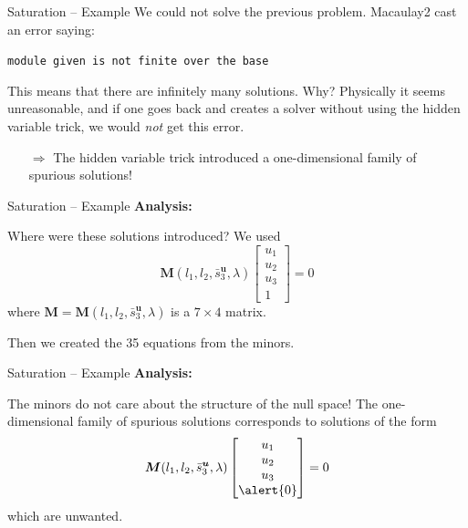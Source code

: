 \documentclass[aspectratio=169]{beamer}
\newcommand{\mat}[1]{\bm{#1}}
\begin{document}
\begin{frame}{Saturation -- Example}
We could not solve the previous problem. Macaulay2 cast an error
saying:
\begin{center}
    \texttt{module given is not finite over the base}
\end{center}

This means that there are infinitely many solutions. Why? Physically it seems unreasonable,
and if one goes back and creates a solver without using the hidden variable trick, we would
\emph{not} get this error.

\begin{itemize}
    \item[$\Rightarrow$] The hidden variable trick introduced a one-dimensional family of
                         spurious solutions!
\end{itemize}
\end{frame}

\begin{frame}{Saturation -- Example}
\textbf{Analysis:}

Where were these solutions introduced?
We used
\begin{equation*}
\mat{M}(l_1,l_2,\bar{s}_3^{\mat{u}},\lambda)\begin{bmatrix} u_1 \\ u_2 \\ u_3 \\1\end{bmatrix} = 0
\end{equation*}
where $\mat{M} = \mat{M}(l_1,l_2,\bar{s}_3^{\mat{u}},\lambda)$ is a $7\times 4$ matrix.

Then we created the 35 equations from the minors.

\end{frame}

\begin{frame}{Saturation -- Example}
\textbf{Analysis:}

The minors do not care about the structure of the null space!
The one-dimensional family of spurious solutions corresponds to solutions
of the form
\begin{equation*}
\mat{M}(l_1,l_2,\bar{s}_3^{\mat{u}},\lambda)\begin{bmatrix} u_1 \\ u_2 \\ u_3 \\\alert{0} \end{bmatrix} = 0
\end{equation*}
which are unwanted.
\end{frame}
\end{document}
